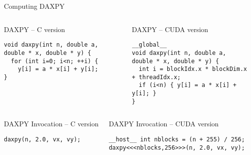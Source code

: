 \begin{frame}[t,fragile]{Computing DAXPY}
\begin{columns}[T]

\begin{block}{DAXPY -- C version}
\begin{lstlisting}
void daxpy(int n, double a, double * x, double * y) {
  for (int i=0; i<n; ++i) {
    y[i] = a * x[i] + y[i];
}
\end{lstlisting}
\end{block}

\pause
{}
\begin{block}{DAXPY -- CUDA version}
\begin{lstlisting}[morekeywords=__global__]
__global__
void daxpy(int n, double a, double * x, double * y) {
  int i = blockIdx.x * blockDim.x + threadIdx.x;
  if (i<n) { y[i] = a * x[i] + y[i]; }
}
\end{lstlisting}
\end{block}
\end{columns}

\begin{columns}[T]

\begin{block}{DAXPY Invocation -- C version}
\begin{lstlisting}
daxpy(n, 2.0, vx, vy);
\end{lstlisting}
\end{block}

\pause
{}
\begin{block}{DAXPY Invocation -- CUDA version}
\begin{lstlisting}[morekeywords=__global__]
__host__ int nblocks = (n + 255) / 256;
daxpy<<<nblocks,256>>>(n, 2.0, vx, vy);
\end{lstlisting}
\end{block}
\end{columns}

\end{frame}


